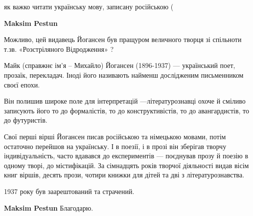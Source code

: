 \begin{itemize}
\begin{itemize}
\end{itemize}

 
як важко читати українську мову, записану російською (


 
\textbf{Maksim Pestun}

Можливо, цей видавець Йогансен був пращуром величного творця зі спільноти т.зв.
«Розстріляного Відродження» ?

Майк (справжнє ім’я – Михайло) Йогансен (1896-1937) — україн­ський поет,
прозаїк, перекладач. Іноді його називають найменш дослідженим письменником
своєї епохи.

Він полишив широке поле для інтерпретацій —літературознавці охоче й сміливо
записують його то до формалістів, то до конструктивістів, то до авангардистів,
то до футуристів.

Свої перші вірші Йогансен писав російською та німецькою мовами, потім остаточно
перейшов на укра­їнську. І в поезії, і в прозі він зберігав творчу
індивідуальність, часто вдавався до експериментів — поєднував прозу й поезію в
одному творі, до містифікацій. За сімнадцять років творчої діяльності видав
вісім книг віршів, десять прози, чотири книжки для дітей та дві з
літературознавства.

1937 року був заарештований та страчений.

\begin{itemize}
 
\textbf{Maksim Pestun}
Благодарю.


 

\end{itemize}
\end{itemize}
